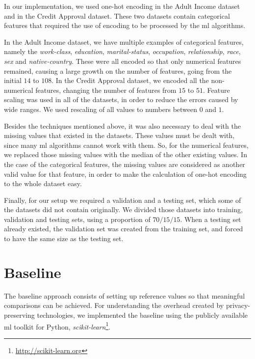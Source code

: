 In our implementation, we used one-hot encoding in the Adult Income dataset and in the Credit Approval dataset. These two datasets contain categorical features that required the use of encoding to be processed by the \ac{ml} algorithms.

In the Adult Income dataset, we have multiple examples of categorical features, namely the \textit{work-class}, \textit{education}, \textit{marital-status}, \textit{occupation}, \textit{relationship}, \textit{race}, \textit{sex} and \textit{native-country}. These were all encoded so that only numerical features remained, causing a large growth on the number of features, going from the initial $14$ to $108$.
In the Credit Approval dataset, we encoded all the non-numerical features, changing the number of features from $15$ to $51$.
Feature scaling was used in all of the datasets, in order to reduce the errors caused by wide ranges. We used rescaling of all values to numbers between $0$ and $1$.

Besides the techniques mentioned above, it was also necessary to deal with the missing values that existed in the datasets. These values must be dealt with, since many \ac{ml} algorithms cannot work with them. So, for the numerical features, we replaced those missing values with the median of the other existing values. In the case of the categorical features, the missing values are considered as another valid value for that feature, in order to make the calculation of one-hot encoding to the whole dataset easy. 

Finally, for our setup we required a validation and a testing set, which some of the datasets did not contain originally. We divided those datasets into training, validation and testing sets, using a proportion of $70/15/15$. When a testing set already existed, the validation set was created from the training set, and forced to have the same size as the testing set.


\section{Baseline}
\label{sec:BaselineImplementation}

The baseline approach consists of setting up reference values so that meaningful comparisons can be achieved. For understanding the overhead created by privacy-preserving technologies, we implemented the baseline using the publicly available \ac{ml} toolkit for Python, \textit{scikit-learn}\footnote{\url{http://scikit-learn.org}}.

